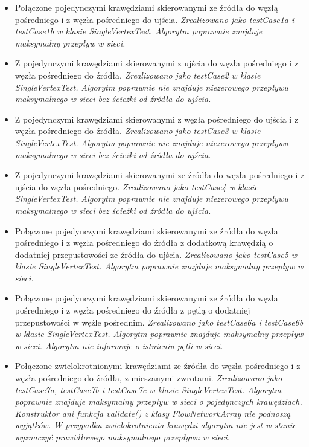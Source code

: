 \begin{itemize}[nosep]
    \item Połączone pojedynczymi krawędziami skierowanymi ze źródła do węzłą
    pośredniego i z węzła pośredniego do ujścia.
    \emph{Zrealizowano jako testCase1a i testCase1b w klasie SingleVertexTest.
    Algorytm poprawnie znajduje maksymalny przepływ w sieci.}

    \item Z pojedynczymi krawędziami skierowanymi z ujścia do węzła pośredniego
    i z węzła pośredniego do źródła.
    \emph{Zrealizowano jako testCase2 w klasie SingleVertexTest. Algorytm
    poprawnie nie znajduje niezerowego przepływu maksymalnego w sieci bez
    ścieżki od źródła do ujścia.}

    \item Z pojedynczymi krawędziami skierowanymi z węzła pośredniego do ujścia
    i z węzła pośredniego do źródła.
    \emph{Zrealizowano jako testCase3 w klasie SingleVertexTest. Algorytm
    poprawnie nie znajduje niezerowego przepływu maksymalnego w sieci
    bez ścieżki od źródła do ujścia.}

    \item Z pojedynczymi krawędziami skierowanymi ze źródła do węzła pośredniego
    i z ujścia do węzła pośredniego.
    \emph{Zrealizowano jako testCase4 w klasie SingleVertexTest. Algorytm
    poprawnie nie znajduje niezerowego przepływu maksymalnego w sieci
    bez ścieżki od źródła do ujścia.}

    \item Połączone pojedynczymi krawędziami skierowanymi ze źródła do węzła
    pośredniego i z węzła pośredniego do źródła z dodatkową krawędzią o
    dodatniej przepustowości ze źródła do ujścia.
    \emph{Zrealizowano jako testCase5 w klasie SingleVertexTest. Algorytm
    poprawnie znajduje maksymalny przepływ w sieci.}

    \item Połączone pojedynczymi krawędziami skierowanymi ze źródła do węzła
    pośredniego i z węzła pośredniego do źródła z pętlą o dodatniej
    przepustowości w węźle pośrednim.
    \emph{Zrealizowano jako testCase6a i testCase6b w klasie SingleVertexTest.
    Algorytm poprawnie znajduje maksymalny przepływ w sieci. Algorytm nie informuje
    o istnieniu pętli w sieci.}

    \item Połączone zwielokrotnionymi krawędziami ze źródła do węzła pośredniego
    i z węzła pośredniego do źródła, z mieszanymi zwrotami.
    \emph{Zrealizowano jako testCase7a, testCase7b i testCase7c w klasie
    SingleVertexTest. Algorytm poprawnie znajduje maksymalny przepływ w sieci
    o pojedynczych krawędziach. Konstruktor ani funkcja validate() z klasy
    FlowNetworkArray nie podnoszą wyjątków. W przypadku zwielokrotnienia
    krawędzi algorytm nie jest w stanie wyznaczyć prawidłowego maksymalnego
    przepływu w sieci.}


\end{itemize}

